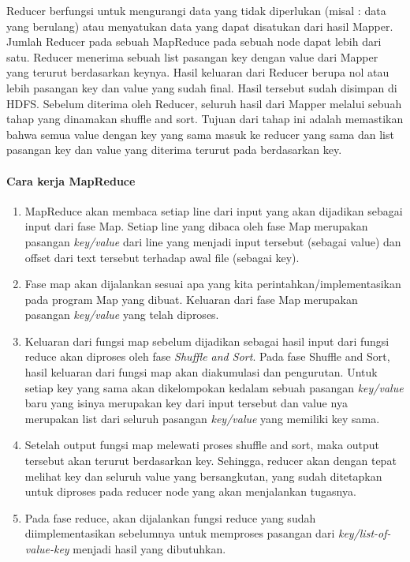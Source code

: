 Reducer berfungsi untuk mengurangi data yang tidak diperlukan (misal : data yang berulang) atau menyatukan data yang dapat disatukan dari hasil Mapper. Jumlah Reducer pada sebuah MapReduce pada sebuah node dapat lebih dari satu. Reducer menerima sebuah list pasangan key dengan value dari Mapper yang terurut berdasarkan keynya. Hasil keluaran dari Reducer berupa nol atau lebih pasangan key dan value yang sudah final. Hasil tersebut sudah disimpan di HDFS. Sebelum diterima oleh Reducer, seluruh hasil dari Mapper melalui sebuah tahap yang dinamakan shuffle and sort. Tujuan dari tahap ini adalah memastikan bahwa semua value dengan key yang sama masuk ke reducer yang sama dan list pasangan key dan value yang diterima terurut pada berdasarkan key.

\paragraph{Cara kerja MapReduce}


\begin{enumerate}
	\item MapReduce akan membaca setiap line dari input yang akan dijadikan sebagai input dari fase Map. Setiap line yang dibaca oleh fase Map merupakan pasangan \textit{key/value} dari line yang menjadi input tersebut (sebagai value) dan offset dari text tersebut terhadap awal file (sebagai key).
	\item Fase map akan dijalankan sesuai apa yang kita perintahkan/implementasikan pada program Map yang dibuat. Keluaran dari fase Map merupakan pasangan \textit{key/value} yang telah diproses.
	\item Keluaran dari fungsi map sebelum dijadikan sebagai hasil input dari fungsi reduce akan diproses oleh fase \textit{Shuffle and Sort}. Pada fase Shuffle and Sort, hasil keluaran dari fungsi map akan diakumulasi dan pengurutan. Untuk setiap key yang sama akan dikelompokan kedalam sebuah pasangan \textit{key/value} baru yang isinya merupakan key dari input tersebut dan value nya merupakan list dari seluruh pasangan \textit{key/value} yang memiliki key sama.
	\item Setelah output fungsi map melewati proses shuffle and sort, maka output tersebut akan terurut berdasarkan key. Sehingga, reducer akan dengan tepat melihat key dan seluruh value yang bersangkutan, yang sudah ditetapkan untuk diproses pada reducer node yang akan menjalankan tugasnya.
	\item Pada fase reduce, akan dijalankan fungsi reduce yang sudah diimplementasikan sebelumnya untuk memproses pasangan dari \textit{key/list-of-value-key} menjadi hasil yang dibutuhkan.
\end{enumerate}

